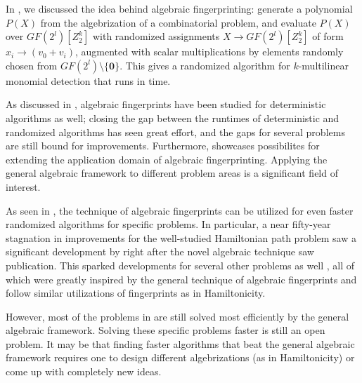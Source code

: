 In , we discussed the idea behind 
algebraic fingerprinting: generate a polynomial $P(X)$ from the algebrization of 
a combinatorial problem, and evaluate $P(X)$ over $GF(2^{l})[Z_2^k]$ with 
randomized assignments $X \to GF(2^{l})[Z_2^k]$ of form 
$x_i \to (v_0 + v_i)$, augmented with scalar multiplications 
by elements randomly chosen from $GF(2^{l}) \setminus \{\mathbf{0}\}$. 
This gives a randomized algorithm for 
$k$-multilinear monomial detection that runs in  time.

As discussed in , algebraic fingerprints 
have been studied for deterministic algorithms as well; closing 
the gap between the runtimes of deterministic and randomized algorithms 
has seen great effort, and the gaps for several problems are still bound for improvements.
Furthermore,  showcases possibilites for extending the 
application domain of algebraic fingerprinting. Applying the general algebraic framework 
to different problem areas is a significant field of interest.

As seen in , 
the technique of algebraic fingerprints can be utilized for even 
faster randomized algorithms for specific problems. 
In particular, a near fifty-year stagnation 
in improvements for the well-studied Hamiltonian path problem saw 
a significant development by \citeauthor{Björklund14} right after 
the novel algebraic technique \cite{Koutis08} saw publication. 
This sparked developments for several other 
problems as well \cite{Björklund17}, all of which were greatly inspired by 
the general technique of algebraic fingerprints and 
follow similar utilizations of fingerprints as in Hamiltonicity.

However, most of the problems in  are still 
solved most efficiently by the general algebraic framework. Solving these 
specific problems faster is still an open problem. 
It may be that 
finding faster algorithms that beat the general algebraic framework requires 
one to design different algebrizations (as in Hamiltonicity) 
or come up with completely new ideas.
